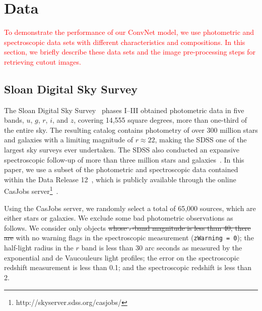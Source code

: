 \documentclass[fleqn,usenatbib]{mnras}
\newcommand{\changed}[1]{\textcolor{red}{#1}}
\begin{document}
\section{Data}
  \label{sec:data}

\changed{
To demonstrate the performance of our ConvNet model, we use photometric and
spectroscopic data sets with different characteristics and compositions.
In this section, we briefly describe these data sets and the image pre-processing
steps for retrieving cutout images.
}

\subsection{Sloan Digital Sky Survey}
  \label{sec:sdss}



The Sloan Digital Sky Survey~\citep[SDSS;][]{york2000sloan}
phases I--III obtained photometric data in five bands,
$u$, $g$, $r$, $i$, and $z$,
covering 14,555 square degrees, more than one-third of the entire sky.
The resulting catalog contains photometry of over 300 million stars and galaxies
with a limiting magnitude of $r \approx 22$,
making the SDSS one of the largest sky surveys ever undertaken.
The SDSS also conducted an expansive spectroscopic follow-up of
more than three million stars and galaxies~\citep{eisenstein2011sdss}.
In this paper, we use a subset of the photometric and spectroscopic data
contained within the Data Release 12~\citep[DR12;][]{alam2015eleventh},
which is publicly available through the online CasJobs
server\footnote{http://skyserver.sdss.org/casjobs/}~\citep{li2008casjobs}.

Using the CasJobs server, we randomly select a total of 65,000 sources, which are either stars or galaxies.
We exclude some bad photometric observations as follows.
We consider only objects
\sout{
whose $r$-band magnitude is less than 40; there are
}
with no warning flags in the spectroscopic measurement (\texttt{zWarning = 0});
the half-light radius in the $r$ band is less than 30 arc seconds
as measured by the exponential and de Vaucouleurs light profiles;
the error on the spectroscopic redshift measurement is less than 0.1; and
the spectroscopic redshift is less than 2.
\end{document}

